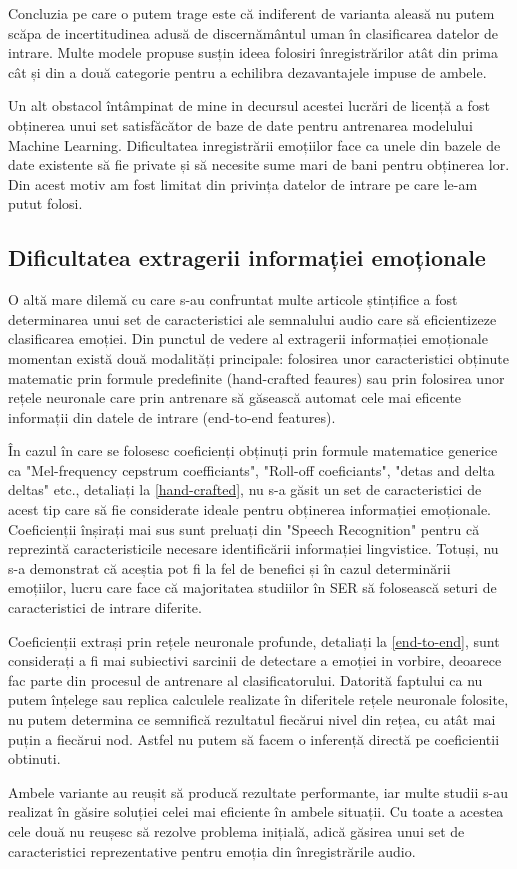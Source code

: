 \documentclass[a4paper,12pt]{book}
\begin{document}
					Concluzia pe care o putem trage este că indiferent de varianta aleasă nu putem scăpa de incertitudinea adusă de discernământul uman în clasificarea datelor de intrare. Multe modele propuse susțin ideea folosiri înregistrărilor atât din prima cât și din a două categorie pentru a echilibra dezavantajele impuse de ambele. \par
					Un alt obstacol întâmpinat de mine in decursul acestei lucrări de licență a fost obținerea unui set satisfăcător de baze de date pentru antrenarea modelului Machine Learning. Dificultatea inregistrării emoțiilor face ca unele din bazele de date existente să fie private și să necesite sume mari de bani pentru obținerea lor. Din acest motiv am fost limitat din privința datelor de intrare pe care le-am putut folosi.
				
				\subsection{Dificultatea extragerii informației emoționale} \label{dif_fex}
					O altă mare dilemă cu care s-au confruntat multe articole ștințifice a fost determinarea unui set de caracteristici ale semnalului audio care să eficientizeze clasificarea emoției. Din punctul de vedere al extragerii informației emoționale momentan există două modalități principale: folosirea unor caracteristici obținute matematic prin formule predefinite (hand-crafted feaures) sau prin folosirea unor rețele neuronale care prin antrenare să găsească automat cele mai eficente informații din datele de intrare (end-to-end features). \par
					În cazul în care se folosesc coeficienți obținuți prin formule matematice generice ca "Mel-frequency cepstrum coefficiants", "Roll-off coeficiants", "detas and delta deltas" etc., detaliați la \ref{hand-crafted}, nu s-a găsit un set de caracteristici de acest tip care să fie considerate ideale pentru obținerea informației emoționale. Coeficienții înșirați mai sus sunt preluați din "Speech Recognition" pentru că reprezintă caracteristicile necesare identificării informației lingvistice. Totuși, nu s-a demonstrat că aceștia pot fi la fel de benefici și în cazul determinării emoțiilor, lucru care face că majoritatea studiilor în SER să folosească seturi de caracteristici de intrare diferite. \par
					Coeficienții extrași prin rețele neuronale profunde, detaliați la \ref{end-to-end}, sunt considerați a fi mai subiectivi sarcinii de detectare a emoției in vorbire, deoarece fac parte din procesul de antrenare al clasificatorului. Datorită faptului ca nu putem înțelege sau replica calculele realizate în diferitele rețele neuronale folosite, nu putem determina ce semnifică rezultatul fiecărui nivel din rețea, cu atât mai puțin a fiecărui nod. Astfel nu putem să facem o inferență directă pe coeficientii obtinuti. \par
					Ambele variante au reușit să producă rezultate performante, iar multe studii s-au realizat în găsire soluției celei mai eficiente în ambele situații. Cu toate a acestea cele două nu reușesc să rezolve problema inițială, adică găsirea unui set de caracteristici reprezentative pentru emoția din înregistrările audio. \par
\end{document}
